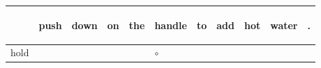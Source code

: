 \documentclass[landscape]{article}
\newcommand{\ssp}{\hspace{2pt}}
\newcommand{\map}{\cellcolor{y}$\boldsymbol\circ$}
\begin{document}
\newpage

\noindent\begin{tabular}{|l|p{10pt}|p{10pt}|p{10pt}|p{10pt}|p{10pt}|p{10pt}|p{10pt}|p{10pt}|p{10pt}|p{10pt}|}
\hline
&\begin{sideways}\cellcolor{ref0}push\hspace{12pt}\end{sideways}&\begin{sideways}\cellcolor{ref1}down\hspace{12pt}\end{sideways}&\begin{sideways}\cellcolor{ref2}on\hspace{12pt}\end{sideways}&\begin{sideways}\cellcolor{ref3}the\hspace{12pt}\end{sideways}&\begin{sideways}\cellcolor{ref4}handle\hspace{12pt}\end{sideways}&\begin{sideways}\cellcolor{ref5}to\hspace{12pt}\end{sideways}&\begin{sideways}\cellcolor{ref6}add\hspace{12pt}\end{sideways}&\begin{sideways}\cellcolor{ref7}hot\hspace{12pt}\end{sideways}&\begin{sideways}\cellcolor{ref8}water\hspace{12pt}\end{sideways}&\begin{sideways}\cellcolor{ref9}.\hspace{12pt}\end{sideways}\\
\hline
\ssp \cellcolor{ref4}hold \ssp&\hspace{2pt}&\hspace{2pt}&\hspace{2pt}&\hspace{2pt}&\hspace{2pt}\map&\hspace{2pt}&\hspace{2pt}&\hspace{2pt}&\hspace{2pt}&\hspace{2pt}\\

\end{tabular}
\end{document}
